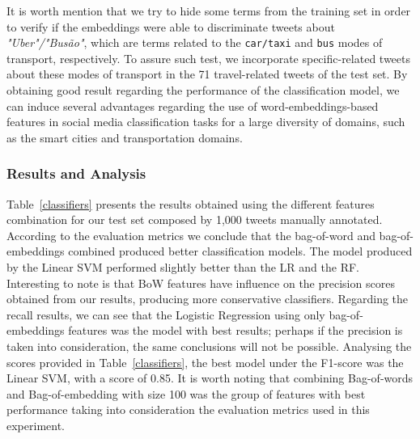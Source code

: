 It is worth mention that we try to hide some terms from the training set in order to verify if the embeddings were able to discriminate tweets about \emph{"Uber"/"Busão"}, which are terms related to the \texttt{car/taxi} and \texttt{bus} modes of transport, respectively. To assure such test, we incorporate specific-related tweets about these modes of transport in the 71 travel-related tweets of the test set. By obtaining good result regarding the performance of the classification model, we can induce several advantages regarding the use of word-embeddings-based features in social media classification tasks for a large diversity of domains, such as the smart cities and transportation domains.

\subsubsection{Results and Analysis}
\label{subsubsec:results_rio_de_janeiro_sao_paulo}
Table~\ref{classifiers} presents the results obtained using the different features combination for our test set composed by 1,000 tweets manually annotated. According to the evaluation metrics we conclude that the bag-of-word and bag-of-embeddings combined produced better classification models. The model produced by the Linear SVM performed slightly better than the LR and the RF. Interesting to note is that \gls{BoW} features have influence on the precision scores obtained from our results, producing more conservative classifiers. Regarding the recall results, we can see that the Logistic Regression using only bag-of-embeddings features was the model with best results; perhaps if the precision is taken into consideration, the same conclusions will not be possible. Analysing the scores provided in Table~\ref{classifiers}, the best model under the F1-score was the Linear SVM, with a score of 0.85. It is worth noting that combining Bag-of-words and Bag-of-embedding with size 100 was the group of features with best performance taking into consideration the evaluation metrics used in this experiment.


